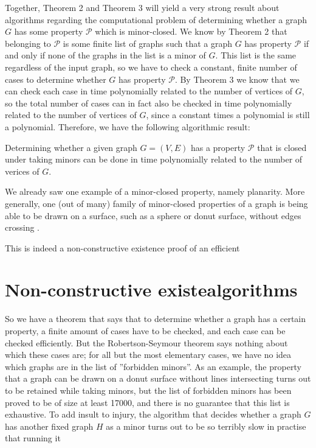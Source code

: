 Together, Theorem 2 and Theorem 3 will yield a very strong result about algorithms regarding the computational problem of determining whether a graph $G$ has some property $\mathcal{P}$ which is minor-closed. We know by Theorem 2 that belonging to $\mathcal{P}$ is some finite list of graphs such that a graph $G$ has property $\mathcal{P}$ if and only if none of the graphs in the list is a minor of $G$. This list is the same regardless of the input graph, so we have to check a constant, finite number of cases to determine whether $G$ has property $\mathcal{P}$. By Theorem 3 we know that we can check each case in time polynomially related to the number of vertices of $G$, so the total number of cases can in fact also be checked in time polynomially related to the number of vertices of $G$, since a constant times a polynomial is still a polynomial. Therefore, we have the following algorithmic result:
\begin{theorem}
Determining whether a given graph $G=(V, E)$ has a property $\mathcal{P}$ that is closed under taking minors can be done in time polynomially related to the number of verices of $G$.
\end{theorem}

We already saw one example of a minor-closed property, namely planarity. More generally, one (out of many) family of minor-closed properties of a graph is being able to be drawn on a surface, such as a sphere or donut surface, without edges crossing \cite{GraphMinor2020}.

This is indeed a non-constructive existence proof of an efficient 

\section{Non-constructive existealgorithms}
So we have a theorem that says that to determine whether a graph has a certain property, a finite amount of cases have to be checked, and each case can be checked efficiently. But the Robertson-Seymour theorem says nothing about which these cases are; for all but the most elementary cases, we have no idea which graphs are in the list of ''forbidden minors''. As an example, the property that a graph can be drawn on a donut surface without lines intersecting turns out to be retained while taking minors, but the list of forbidden minors has been proved to be of size at least 17000, and there is no guarantee that this list is exhaustive. To add insult to injury, the algorithm that decides whether a graph $G$ has another fixed graph $H$ as a minor turns out to be so terribly slow in practise that running it

